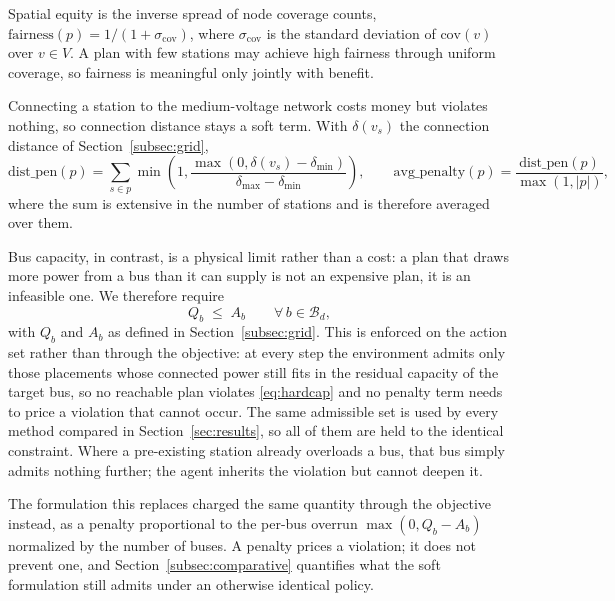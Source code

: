 \documentclass[graybox]{svmult}
\begin{document}
\label{subsubsec:fairness}
Spatial equity is the inverse spread of node coverage counts, $\mathrm{fairness}(p)=1/(1+\sigma_{\mathrm{cov}})$, where $\sigma_{\mathrm{cov}}$ is the standard deviation of $\mathrm{cov}(v)$ over $v\in V$. A plan with few stations may achieve high fairness through uniform coverage, so fairness is meaningful only jointly with benefit.

\label{subsubsec:gridpen}
Connecting a station to the medium-voltage network costs money but violates
nothing, so connection distance stays a soft term. With $\delta(v_s)$ the
connection distance of Section~\ref{subsec:grid},
\begin{equation}
\label{eq:gridpen}
\mathrm{dist\_pen}(p)
=
\sum_{s\in p}
\min\left(
1,
\frac{\max(0,\delta(v_s)-\delta_{\min})}
{\delta_{\max}-\delta_{\min}}
\right),
\qquad
\mathrm{avg\_penalty}(p)
=
\frac{\mathrm{dist\_pen}(p)}{\max(1,|p|)},
\end{equation}
where the sum is extensive in the number of stations and is therefore averaged
over them.

\label{subsubsec:gridcap}
Bus capacity, in contrast, is a physical limit rather than a cost: a plan that
draws more power from a bus than it can supply is not an expensive plan, it is an
infeasible one. We therefore require
\begin{equation}
\label{eq:hardcap}
Q_b\;\le\;A_b
\qquad
\forall\,b\in\mathcal{B}_d ,
\end{equation}
with $Q_b$ and $A_b$ as defined in Section~\ref{subsec:grid}. This is enforced on
the action set rather than through the objective: at every step the environment
admits only those placements whose connected power still fits in the residual
capacity of the target bus, so no reachable plan violates \eqref{eq:hardcap} and
no penalty term needs to price a violation that cannot occur. The same admissible
set is used by every method compared in Section~\ref{sec:results}, so all of them
are held to the identical constraint. Where a pre-existing station already
overloads a bus, that bus simply admits nothing further; the agent inherits the
violation but cannot deepen it.

The formulation this replaces charged the same quantity through the objective instead, as a penalty proportional to the per-bus overrun $\max(0,Q_b-A_b)$ normalized by the number of buses. A penalty prices a violation; it does not prevent one, and Section~\ref{subsec:comparative} quantifies what the soft formulation still admits under an otherwise identical policy.
\end{document}

